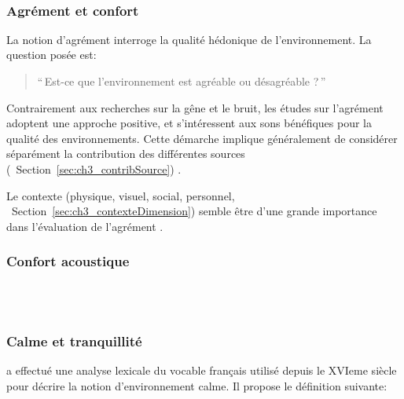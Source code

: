 \\


\subsubsection{Agrément et confort}

La notion d'agrément interroge la qualité hédonique de l'environnement. La question posée est:

\begin{quote}
``\,Est-ce que l'environnement est agréable ou désagréable ?\,''
\end{quote}
 
Contrairement aux recherches sur la gêne et le bruit, les études sur l'agrément adoptent une approche positive, et s'intéressent aux sons bénéfiques pour la qualité des environnements. Cette démarche implique généralement de considérer séparément la contribution des différentes sources (\cf~Section~\ref{sec:ch3_contribSource})  \citep{lavandier2006contribution,garcia2012validation}.

Le contexte (physique, visuel, social, personnel, \cf~Section~\ref{sec:ch3_contexteDimension}) semble être d'une grande importance dans l'évaluation de l'agrément \citep{guillen2007importance}.


\subsubsection{Confort acoustique}
\label{sec:ch3_confort}


\\
\\

\subsubsection{Calme et tranquillité}

\citep{delaitre2012definition} a effectué une analyse lexicale du vocable  français utilisé depuis le XVIeme siècle pour décrire la notion d'environnement calme. Il propose le définition suivante:

